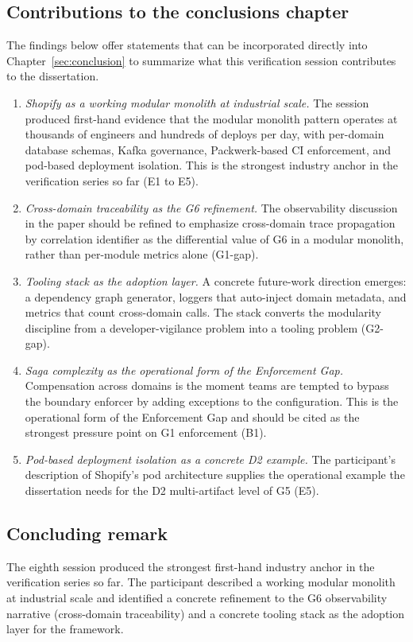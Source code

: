 \subsection*{Contributions to the conclusions chapter}

The findings below offer statements that can be incorporated directly into Chapter~\ref{sec:conclusion} to summarize what this verification session contributes to the dissertation.

\begin{enumerate}[itemsep=3pt,topsep=2pt]
  \item \emph{Shopify as a working modular monolith at industrial scale.} The session produced first-hand evidence that the modular monolith pattern operates at thousands of engineers and hundreds of deploys per day, with per-domain database schemas, Kafka governance, Packwerk-based CI enforcement, and pod-based deployment isolation. This is the strongest industry anchor in the verification series so far (E1 to E5).
  \item \emph{Cross-domain traceability as the G6 refinement.} The observability discussion in the paper should be refined to emphasize cross-domain trace propagation by correlation identifier as the differential value of G6 in a modular monolith, rather than per-module metrics alone (G1-gap).
  \item \emph{Tooling stack as the adoption layer.} A concrete future-work direction emerges: a dependency graph generator, loggers that auto-inject domain metadata, and metrics that count cross-domain calls. The stack converts the modularity discipline from a developer-vigilance problem into a tooling problem (G2-gap).
  \item \emph{Saga complexity as the operational form of the Enforcement Gap.} Compensation across domains is the moment teams are tempted to bypass the boundary enforcer by adding exceptions to the configuration. This is the operational form of the Enforcement Gap and should be cited as the strongest pressure point on G1 enforcement (B1).
  \item \emph{Pod-based deployment isolation as a concrete D2 example.} The participant's description of Shopify's pod architecture supplies the operational example the dissertation needs for the D2 multi-artifact level of G5 (E5).
\end{enumerate}

\subsection*{Concluding remark}

The eighth session produced the strongest first-hand industry anchor in the verification series so far. The participant described a working modular monolith at industrial scale and identified a concrete refinement to the G6 observability narrative (cross-domain traceability) and a concrete tooling stack as the adoption layer for the framework.
